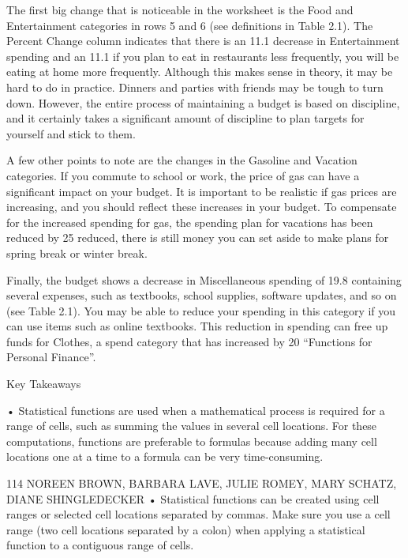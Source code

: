 The first big change that is noticeable in the worksheet is the Food and Entertainment categories in
rows 5 and 6 (see definitions in Table 2.1). The Percent Change column indicates that there is an 11.1%
decrease in Entertainment spending and an 11.1%
if you plan to eat in restaurants less frequently, you will be eating at home more frequently. Although
this makes sense in theory, it may be hard to do in practice. Dinners and parties with friends may be
tough to turn down. However, the entire process of maintaining a budget is based on discipline, and
it certainly takes a significant amount of discipline to plan targets for yourself and stick to them.

A few other points to note are the changes in the Gasoline and Vacation categories. If you commute
to school or work, the price of gas can have a significant impact on your budget. It is important
to be realistic if gas prices are increasing, and you should reflect these increases in your budget. To
compensate for the increased spending for gas, the spending plan for vacations has been reduced by
25%
reduced, there is still money you can set aside to make plans for spring break or winter break.

Finally, the budget shows a decrease in Miscellaneous spending of 19.8%
containing several expenses, such as textbooks, school supplies, software updates, and so on (see
Table 2.1). You may be able to reduce your spending in this category if you can use items such as
online textbooks. This reduction in spending can free up funds for Clothes, a spend category that has
increased by 20%
“Functions for Personal Finance”.


Key Takeaways


• Statistical functions are used when a mathematical process is required for a range of cells, such as summing
the values in several cell locations. For these computations, functions are preferable to formulas because
adding many cell locations one at a time to a formula can be very time-consuming.



114 NOREEN BROWN, BARBARA LAVE, JULIE ROMEY, MARY SCHATZ, DIANE SHINGLEDECKER
• Statistical functions can be created using cell ranges or selected cell locations separated by commas. Make
sure you use a cell range (two cell locations separated by a colon) when applying a statistical function to a
contiguous range of cells.

